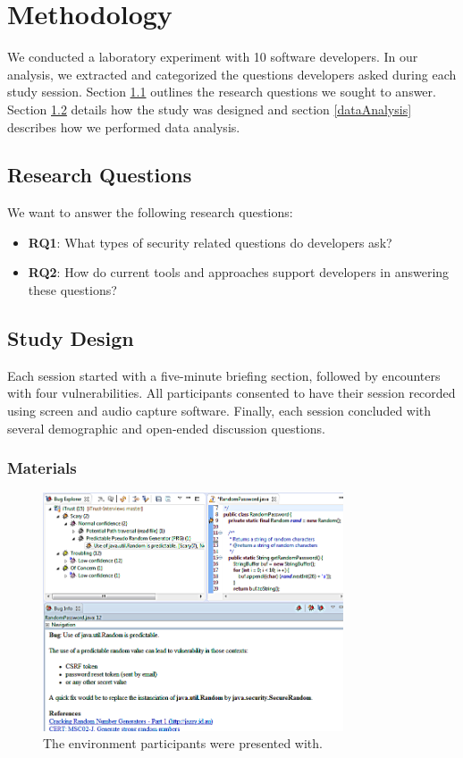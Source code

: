 \documentclass[conference]{IEEEtran}
\begin{document}
\section{Methodology}
\label{sec:meth}
We conducted a laboratory experiment with 10 software developers. In our analysis, we extracted and categorized the questions developers asked during each study session. 
Section \ref{rqs} outlines the research questions we sought to answer. 
Section \ref{studyDesign} details how the study was designed and section \ref{dataAnalysis} describes how we performed data analysis.


\subsection{Research Questions}
\label{rqs}
We want to answer the following research questions:
\begin{itemize}
\item \textbf{RQ1}: What types of security related questions do developers ask?
\item \textbf{RQ2}: How do current tools and approaches support developers in answering these questions?
\end{itemize}


\subsection{Study Design}
\label{studyDesign}
Each session started with a five-minute briefing section, followed by encounters with four vulnerabilities.
All participants consented to have their session recorded using screen and audio capture software.
Finally, each session concluded with several demographic and open-ended discussion questions.


\subsubsection{Materials}

\begin{figure}
\centering
\includegraphics[width=3.5in]{Images/environment.png}
\caption{The environment participants were presented with.}
\label{fig:environment} 
\end{figure}
	
\end{document}
